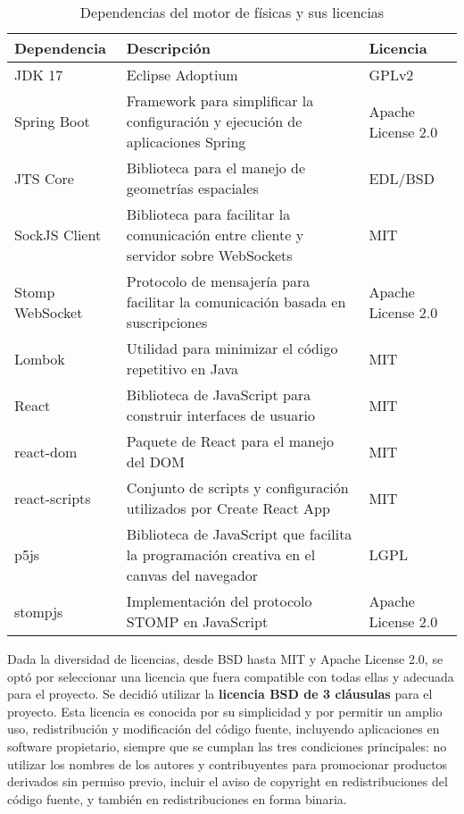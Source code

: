 \begin{table}[h]
\centering
\begin{tabularx}{\textwidth}{| l | >{\raggedright\arraybackslash}X | l |}
\hline
\textbf{Dependencia} & \textbf{Descripción} & \textbf{Licencia} \\ \hline
    JDK 17\cite{jdk17_adoptium_license} & Eclipse Adoptium & GPLv2 \\ \hline
    Spring Boot\cite{springboot_license} & Framework para simplificar la configuración y ejecución de aplicaciones Spring & Apache License 2.0 \\ \hline
    JTS Core\cite{jtscore_license} & Biblioteca para el manejo de geometrías espaciales & EDL/BSD \\ \hline
    SockJS Client\cite{sockjsclient_license} & Biblioteca para facilitar la comunicación entre cliente y servidor sobre WebSockets & MIT \\ \hline
    Stomp WebSocket\cite{stompwebsocket_license} & Protocolo de mensajería para facilitar la comunicación basada en suscripciones & Apache License 2.0 \\ \hline
    Lombok\cite{lombok_license} & Utilidad para minimizar el código repetitivo en Java & MIT \\ \hline
    React\cite{react_license} & Biblioteca de JavaScript para construir interfaces de usuario & MIT \\ \hline
    react-dom\cite{reactdom_license} & Paquete de React para el manejo del DOM & MIT \\ \hline
    react-scripts \cite{reactscripts_license}& Conjunto de scripts y configuración utilizados por Create React App & MIT \\ \hline
    p5js\cite{p5js_license} & Biblioteca de JavaScript que facilita la programación creativa en el canvas del navegador & LGPL \\ \hline
    stompjs\cite{stompjs_license} & Implementación del protocolo STOMP en JavaScript & Apache License 2.0 \\ \hline
\end{tabularx}
\caption{Dependencias del motor de físicas y sus licencias}
\label{tab:licencias}
\end{table}

\newpage
Dada la diversidad de licencias, desde BSD hasta MIT y Apache License 2.0, se optó por seleccionar una licencia que fuera compatible con todas ellas y adecuada para el proyecto. Se decidió utilizar la \textbf{licencia BSD de 3 cláusulas} para el proyecto. Esta licencia es conocida por su simplicidad y por permitir un amplio uso, redistribución y modificación del código fuente, incluyendo aplicaciones en software propietario, siempre que se cumplan las tres condiciones principales: no utilizar los nombres de los autores y contribuyentes para promocionar productos derivados sin permiso previo, incluir el aviso de copyright en redistribuciones del código fuente, y también en redistribuciones en forma binaria.

